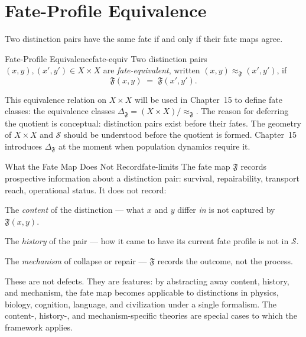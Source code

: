 \documentclass[12pt,twoside,openright]{book}
\newcommand{\fateClasses}{\Delta_{\mathfrak{F}}}
\newcommand{\fateMap}{\mathfrak{F}}
\newcommand{\fateSpace}{\mathcal{S}}
\providecommand{\fateClasses}{\Delta_{\mathfrak{F}}}
\begin{document}
\section{Fate-Profile Equivalence}

Two distinction pairs have the same fate if and only if their
fate maps agree.

\begin{definition}{Fate-Profile Equivalence}{fate-equiv}
Two distinction pairs $(x,y),(x',y')\in X\times X$ are
\emph{fate-equivalent}, written $(x,y)\approx_\fateMap(x',y')$,
if
\[
  \fateMap(x,y) \;=\; \fateMap(x',y').
\]
\end{definition}

This equivalence relation on $X\times X$ will be used in
Chapter~15 to define fate classes: the equivalence classes
$\fateClasses=(X\times X)/{\approx_\fateMap}$. The reason for
deferring the quotient is conceptual: distinction pairs exist
before their fates. The geometry of $X\times X$ and $\fateSpace$
should be understood before the quotient is formed. Chapter~15
introduces $\fateClasses$ at the moment when population
dynamics require it.

\begin{remark}{What the Fate Map Does Not Record}{fate-limits}
The fate map $\fateMap$ records prospective information about
a distinction pair: survival, repairability, transport reach,
operational status. It does not record:

The \emph{content} of the distinction --- what $x$ and $y$
differ \emph{in} is not captured by $\fateMap(x,y)$.

The \emph{history} of the pair --- how it came to have its
current fate profile is not in $\fateSpace$.

The \emph{mechanism} of collapse or repair --- $\fateMap$
records the outcome, not the process.

These are not defects. They are features: by abstracting away
content, history, and mechanism, the fate map becomes
applicable to distinctions in physics, biology, cognition,
language, and civilization under a single formalism. The
content-, history-, and mechanism-specific theories are special
cases to which the framework applies.
\end{remark}
\end{document}
